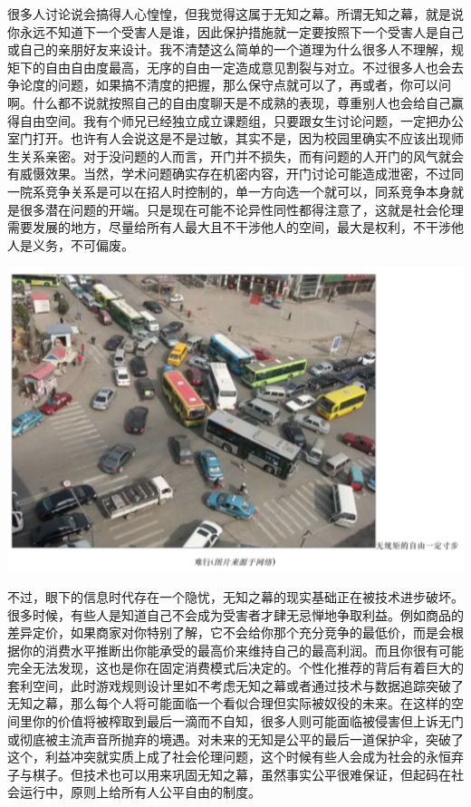 \documentclass[]{book}
\begin{document}
很多人讨论说会搞得人心惶惶，但我觉得这属于无知之幕。所谓无知之幕，就是说你永远不知道下一个受害人是谁，因此保护措施就一定要按照下一个受害人是自己或自己的亲朋好友来设计。我不清楚这么简单的一个道理为什么很多人不理解，规矩下的自由自由度最高，无序的自由一定造成意见割裂与对立。不过很多人也会去争论度的问题，如果搞不清度的把握，那么保守点就可以了，再或者，你可以问啊。什么都不说就按照自己的自由度聊天是不成熟的表现，尊重别人也会给自己赢得自由空间。我有个师兄已经独立成立课题组，只要跟女生讨论问题，一定把办公室门打开。也许有人会说这是不是过敏，其实不是，因为校园里确实不应该出现师生关系亲密。对于没问题的人而言，开门并不损失，而有问题的人开门的风气就会有威慑效果。当然，学术问题确实存在机密内容，开门讨论可能造成泄密，不过同一院系竞争关系是可以在招人时控制的，单一方向选一个就可以，同系竞争本身就是很多潜在问题的开端。只是现在可能不论异性同性都得注意了，这就是社会伦理需要发展的地方，尽量给所有人最大且不干涉他人的空间，最大是权利，不干涉他人是义务，不可偏废。

\includegraphics[width=6.67in]{images/wuzhi2}

不过，眼下的信息时代存在一个隐忧，无知之幕的现实基础正在被技术进步破坏。很多时候，有些人是知道自己不会成为受害者才肆无忌惮地争取利益。例如商品的差异定价，如果商家对你特别了解，它不会给你那个充分竞争的最低价，而是会根据你的消费水平推断出你能承受的最高价来维持自己的最高利润。而且你很有可能完全无法发现，这也是你在固定消费模式后决定的。个性化推荐的背后有着巨大的套利空间，此时游戏规则设计里如不考虑无知之幕或者通过技术与数据追踪突破了无知之幕，那么每个人将可能面临一个看似合理但实际被奴役的未来。在这样的空间里你的价值将被榨取到最后一滴而不自知，很多人则可能面临被侵害但上诉无门或彻底被主流声音所抛弃的境遇。对未来的无知是公平的最后一道保护伞，突破了这个，利益冲突就实质上成了社会伦理问题，这个时候有些人会成为社会的永恒弃子与棋子。但技术也可以用来巩固无知之幕，虽然事实公平很难保证，但起码在社会运行中，原则上给所有人公平自由的制度。
\end{document}

